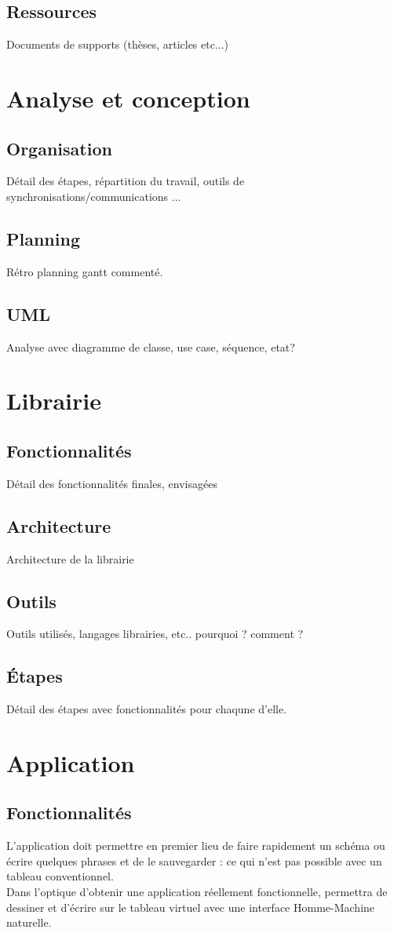 \documentclass{article}
\begin{document}
		\subsection{Ressources}
			Documents de supports (thèses, articles etc...)
	\section{Analyse et conception}
		\subsection{Organisation}
			Détail des étapes, répartition du travail, outils de synchronisations/communications ...
		\subsection{Planning}
			Rétro planning gantt commenté.
		\subsection{UML}
			Analyse avec diagramme de classe, use case, séquence, etat?
	\section{Librairie}
		\subsection{Fonctionnalités}
			Détail des fonctionnalités finales, envisagées
		\subsection{Architecture}
			Architecture de la librairie
		\subsection{Outils}
			Outils utilisés, langages librairies, etc.. pourquoi ? comment ?
		\subsection{Étapes}
			Détail des étapes avec fonctionnalités pour chaqune d'elle.
	\section{Application}
		\subsection{Fonctionnalités}
		L'application doit permettre en premier lieu de faire rapidement un schéma ou écrire quelques phrases
et de le sauvegarder : ce qui n'est pas possible avec un tableau conventionnel. \\ 			
		Dans l'optique d'obtenir une application réellement fonctionnelle, permettra de dessiner 
et d'écrire sur le tableau virtuel avec une interface Homme-Machine naturelle. \\
\end{document}
